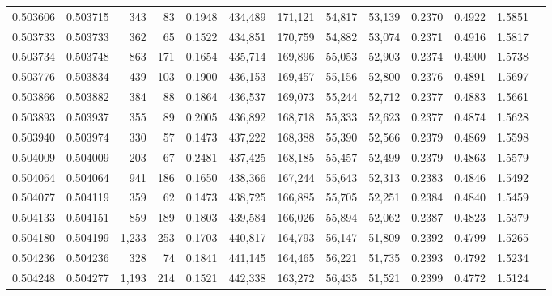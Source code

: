\begin{tabular}{rrrrrrrrrrrrr}
0.503606 & 0.503715 &   343 &    83 &                                     0.1948 & 434,489 & 171,121 &  54,817 &  53,139 & 0.2370 & 0.4922 & 1.5851 \\
0.503733 & 0.503733 &   362 &    65 &                                     0.1522 & 434,851 & 170,759 &  54,882 &  53,074 & 0.2371 & 0.4916 & 1.5817 \\
0.503734 & 0.503748 &   863 &   171 &                                     0.1654 & 435,714 & 169,896 &  55,053 &  52,903 & 0.2374 & 0.4900 & 1.5738 \\
0.503776 & 0.503834 &   439 &   103 &                                     0.1900 & 436,153 & 169,457 &  55,156 &  52,800 & 0.2376 & 0.4891 & 1.5697 \\
0.503866 & 0.503882 &   384 &    88 &                                     0.1864 & 436,537 & 169,073 &  55,244 &  52,712 & 0.2377 & 0.4883 & 1.5661 \\
0.503893 & 0.503937 &   355 &    89 &                                     0.2005 & 436,892 & 168,718 &  55,333 &  52,623 & 0.2377 & 0.4874 & 1.5628 \\
0.503940 & 0.503974 &   330 &    57 &                                     0.1473 & 437,222 & 168,388 &  55,390 &  52,566 & 0.2379 & 0.4869 & 1.5598 \\
0.504009 & 0.504009 &   203 &    67 &                                     0.2481 & 437,425 & 168,185 &  55,457 &  52,499 & 0.2379 & 0.4863 & 1.5579 \\
0.504064 & 0.504064 &   941 &   186 &                                     0.1650 & 438,366 & 167,244 &  55,643 &  52,313 & 0.2383 & 0.4846 & 1.5492 \\
0.504077 & 0.504119 &   359 &    62 &                                     0.1473 & 438,725 & 166,885 &  55,705 &  52,251 & 0.2384 & 0.4840 & 1.5459 \\
0.504133 & 0.504151 &   859 &   189 &                                     0.1803 & 439,584 & 166,026 &  55,894 &  52,062 & 0.2387 & 0.4823 & 1.5379 \\
0.504180 & 0.504199 & 1,233 &   253 &                                     0.1703 & 440,817 & 164,793 &  56,147 &  51,809 & 0.2392 & 0.4799 & 1.5265 \\
0.504236 & 0.504236 &   328 &    74 &                                     0.1841 & 441,145 & 164,465 &  56,221 &  51,735 & 0.2393 & 0.4792 & 1.5234 \\
0.504248 & 0.504277 & 1,193 &   214 &                                     0.1521 & 442,338 & 163,272 &  56,435 &  51,521 & 0.2399 & 0.4772 & 1.5124 \\

\end{tabular}
